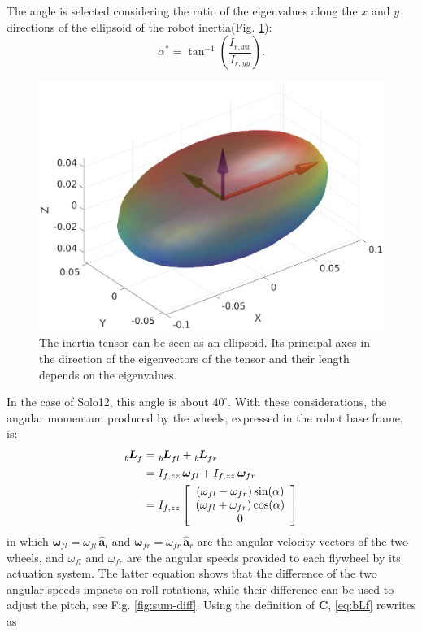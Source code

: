 \documentclass[letterpaper, 10 pt, conference]{ieeeconf}      %
\begin{document}
The angle is selected considering the ratio of the eigenvalues along the $x$ and $y$ directions of the ellipsoid of the robot inertia(Fig. \ref{fig:ellipsoid}):
\begin{equation*}
\alpha^{*}=\tan^{-1}\left(\dfrac{I_{r, xx}}{I_{r, yy}}\right).
\end{equation*}
\begin{figure}
	\centering
	\includegraphics[width=1\linewidth]{figures/inertiaEllipsoid.eps}
	\caption{\small The inertia tensor can be seen as an ellipsoid. Its principal axes in the direction of the eigenvectors of the tensor and their length depends on the eigenvalues.}
	\label{fig:ellipsoid}
\end{figure}
In the case of Solo12, this angle is about $40^{\circ}$. With these considerations, the angular momentum produced by the wheels, expressed in the robot base frame, is:
\begin{equation}
\begin{split}
\tensor[_b]{\bm{L}}{_f} &= \tensor[_b]{\bm{L}}{_{fl}} + \tensor[_b]{\bm{L}}{_{fr}} \\
&=I_{f, zz} \, \bm{\omega}_{fl} + I_{f, zz} \, \bm{\omega}_{fr}\\
&=I_{f, zz}
\left[\begin{array}{c}
\left(\omega_{fl} - \omega_{fr}\right)\sin(\alpha) \\ 
\left(\omega_{fl} +  \omega_{fr}\right)\cos(\alpha) \\
0
\end{array}\right]
\end{split}
\label{eq:bLf}
\end{equation}
in which $\bm{\omega}_{fl}= \omega_{fl} \, \hat{\bm{a}}_{l}$ and $\bm{\omega}_{fr}= \omega_{fr} \, \hat{\bm{a}}_{r}$ are the angular velocity vectors of the two wheels, and $\omega_{fl}$ and $\omega_{fr}$ are the angular speeds provided to each flywheel by its actuation system. The latter equation shows that the difference of the two angular speeds impacts on roll rotations, while their difference can be used to adjust the pitch, see Fig. \ref{fig:sum-diff}. Using the definition of $\bm{C}$, \eqref{eq:bLf} rewrites as
\end{document}

